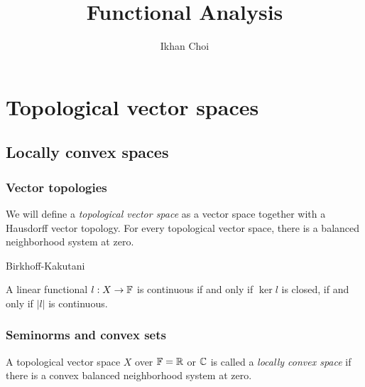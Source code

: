 \documentclass{../../large}
\begin{document}
\title{Functional Analysis}
\author{Ikhan Choi}
\maketitle
\tableofcontents

\part{Topological vector spaces}


\chapter{Locally convex spaces}
\section{Vector topologies}

\begin{prb}
We will define a \emph{topological vector space} as a vector space together with a Hausdorff vector topology.
For every topological vector space, there is a balanced neighborhood system at zero.
\end{prb}
\begin{prb}
\end{prb}
\begin{prb}
\end{prb}
\begin{prb}
Birkhoff-Kakutani
\end{prb}


\begin{prb}
A linear functional $l:X\to\mathbb{F}$ is continuous if and only if $\ker l$ is closed, if and only if $|l|$ is continuous.
\end{prb}


\section{Seminorms and convex sets}
\begin{prb}
A topological vector space $X$ over $\mathbb{F}=\mathbb{R}$ or $\mathbb{C}$ is called a \emph{locally convex space} if there is a convex balanced neighborhood system at zero.

\end{prb}
\end{document}
